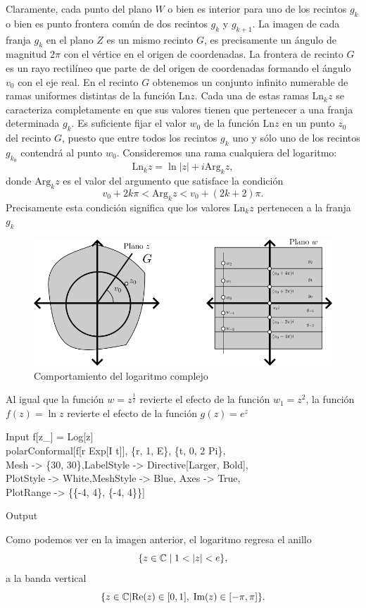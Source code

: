 Claramente, cada punto del plano $W$ o bien es interior para uno de los recintos $g_k$ o bien es punto frontera común de dos recintos $g_k$ y $g_{k+1}$. La imagen de cada franja $g_k$ en el plano $Z$ es un mismo recinto $G$, es precisamente un ángulo de magnitud $2\pi$ con el vértice en el origen de coordenadas. La frontera de recinto $G$ es un rayo rectilíneo que parte de del origen de coordenadas formando el ángulo $v_0$ con el eje real.  En el recinto $G$ obtenemos un conjunto infinito numerable de ramas uniformes distintas de la función $\mbox{Ln}z$. Cada una de estas ramas $\mbox{Ln}_k z$ se caracteriza completamente en que sus valores tienen que pertenecer a una franja determinada $g_k$. Es suficiente fijar el valor $w_0$ de la función $\mbox{Ln}z$ en un punto $z_0$ del recinto $G$, puesto que entre todos los recintos $g_k$ uno y sólo uno de los recintos $g_{k_0}$ contendrá al punto $w_0$. Consideremos una rama cualquiera del logaritmo:
$$\mbox{Ln}_k z=\ln|z|+i\mbox{Arg}_k z,$$ donde $\mbox{Arg}_k z$ es el valor del argumento que satisface la condición 
$$v_0+2k\pi <\mbox{Arg}_k z<v_0+(2k+2)\pi.$$
Precisamente esta condición  significa que los valores $\mbox{Ln}_k z$ pertenecen a la franja $g_k$
\begin{figure}[h!]
	\centering
	\includegraphics[width=0.7\linewidth]{img/log}
	\caption{Comportamiento del logaritmo complejo}
	\label{fig:log}
\end{figure}

Al igual que la función $w=z^\frac{1}{2}$ revierte el efecto de la función $w_1=z^2$, la función $f(z)=\ln z$ revierte el efecto de la función $g(z)=e^z$
\begin{mmaCell}{Input}
	 f[z_] = Log[z]\\polarConformal[f[r Exp[I t]], \{r, 1, E\}, \{t, 0, 2 Pi\},\\Mesh -> \{30, 30\},LabelStyle -> Directive[Larger, Bold],\\PlotStyle -> White,MeshStyle -> Blue, Axes -> True,\\PlotRange -> \{\{-4, 4\}, \{-4, 4\}\}]
\end{mmaCell}
\begin{mmaCell}[moregraphics={moreig={scale=0.7}}]{Output}
\end{mmaCell}
Como podemos ver en la imagen anterior, el logaritmo regresa el anillo $$\{z\in \C\mid 1<|z|<e\},$$ a la banda vertical $$\{z\in \mathbb{C}|\mbox{Re}(z)\in[0,1],\; \mbox{Im}(z)\in [-\pi,\pi]\}.$$

